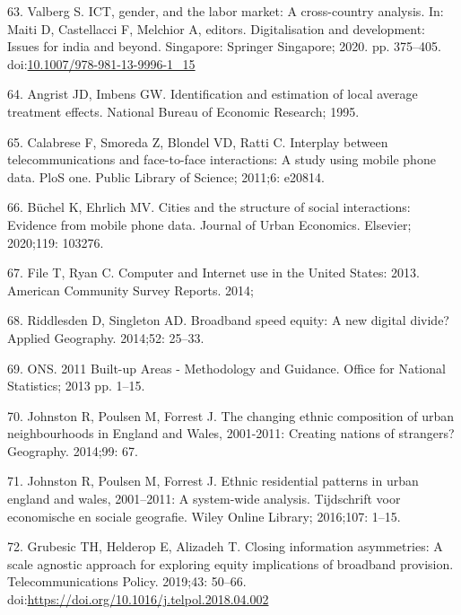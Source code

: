 \documentclass[10pt,letterpaper]{article}
\begin{document}
\leavevmode\hypertarget{ref-Valberg2020}{}%
63. Valberg S. ICT, gender, and the labor market: A cross-country
analysis. In: Maiti D, Castellacci F, Melchior A, editors.
Digitalisation and development: Issues for india and beyond. Singapore:
Springer Singapore; 2020. pp. 375--405.
doi:\href{https://doi.org/10.1007/978-981-13-9996-1_15}{10.1007/978-981-13-9996-1\_15}

\leavevmode\hypertarget{ref-angrist1995identification}{}%
64. Angrist JD, Imbens GW. Identification and estimation of local
average treatment effects. National Bureau of Economic Research; 1995.

\leavevmode\hypertarget{ref-calabrese2011interplay}{}%
65. Calabrese F, Smoreda Z, Blondel VD, Ratti C. Interplay between
telecommunications and face-to-face interactions: A study using mobile
phone data. PloS one. Public Library of Science; 2011;6: e20814.

\leavevmode\hypertarget{ref-buchel2020cities}{}%
66. Büchel K, Ehrlich MV. Cities and the structure of social
interactions: Evidence from mobile phone data. Journal of Urban
Economics. Elsevier; 2020;119: 103276.

\leavevmode\hypertarget{ref-file_computer_2014}{}%
67. File T, Ryan C. Computer and Internet use in the United States:
2013. American Community Survey Reports. 2014;

\leavevmode\hypertarget{ref-riddlesden_broadband_2014}{}%
68. Riddlesden D, Singleton AD. Broadband speed equity: A new digital
divide? Applied Geography. 2014;52: 25--33.

\leavevmode\hypertarget{ref-ons2013}{}%
69. ONS. 2011 Built-up Areas - Methodology and Guidance. Office for
National Statistics; 2013 pp. 1--15.

\leavevmode\hypertarget{ref-johnston_changing_2014}{}%
70. Johnston R, Poulsen M, Forrest J. The changing ethnic composition of
urban neighbourhoods in England and Wales, 2001-2011: Creating nations
of strangers? Geography. 2014;99: 67.

\leavevmode\hypertarget{ref-johnston2016ethnic}{}%
71. Johnston R, Poulsen M, Forrest J. Ethnic residential patterns in
urban england and wales, 2001--2011: A system-wide analysis. Tijdschrift
voor economische en sociale geografie. Wiley Online Library; 2016;107:
1--15.

\leavevmode\hypertarget{ref-GRUBESIC201950}{}%
72. Grubesic TH, Helderop E, Alizadeh T. Closing information
asymmetries: A scale agnostic approach for exploring equity implications
of broadband provision. Telecommunications Policy. 2019;43: 50--66.
doi:\href{https://doi.org/https://doi.org/10.1016/j.telpol.2018.04.002}{https://doi.org/10.1016/j.telpol.2018.04.002}
\end{document}
